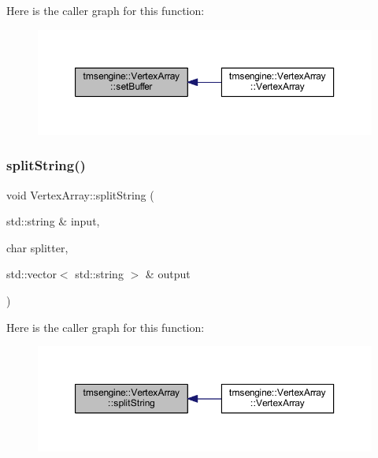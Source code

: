 Here is the caller graph for this function\+:\nopagebreak
\begin{figure}[H]
\begin{center}
\leavevmode
\includegraphics[width=350pt]{classtmsengine_1_1_vertex_array_aded817cf210e13abd10b92475718e3ef_icgraph}
\end{center}
\end{figure}
\mbox{\label{classtmsengine_1_1_vertex_array_a0d589e02258c90f551011be850f180e4}} 
\subsubsection{\texorpdfstring{split\+String()}{splitString()}}
{\footnotesize\ttfamily void Vertex\+Array\+::split\+String (\begin{DoxyParamCaption}\item[{std\+::string \&}]{input,  }\item[{char}]{splitter,  }\item[{std\+::vector$<$ std\+::string $>$ \&}]{output }\end{DoxyParamCaption})\hspace{0.3cm}{\ttfamily [private]}}

Here is the caller graph for this function\+:\nopagebreak
\begin{figure}[H]
\begin{center}
\leavevmode
\includegraphics[width=350pt]{classtmsengine_1_1_vertex_array_a0d589e02258c90f551011be850f180e4_icgraph}
\end{center}
\end{figure}
\mbox{\label{classtmsengine_1_1_vertex_array_a35f3a952fe7089d2ebe71c6d4e2c2443}} 
